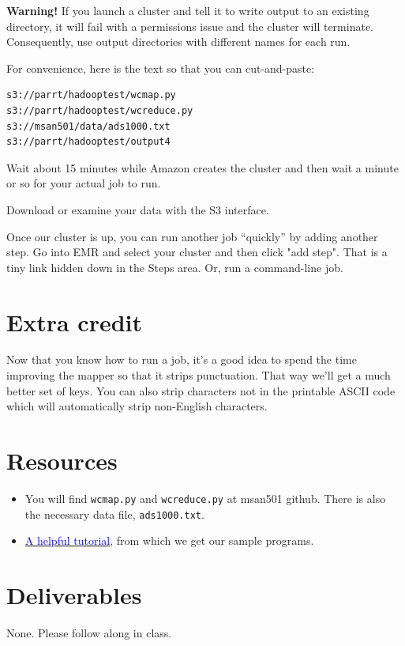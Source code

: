 \begin{fullwidth}
{\bf Warning!} If you launch a cluster and tell it to write output to an existing directory, it will fail with a permissions issue and the cluster will terminate.  Consequently, use output directories with different names for each run.

For convenience, here is the text so that you can cut-and-paste:

\begin{lstlisting}[style=BashInputStyle]
s3://parrt/hadooptest/wcmap.py
s3://parrt/hadooptest/wcreduce.py
s3://msan501/data/ads1000.txt
s3://parrt/hadooptest/output4
\end{lstlisting}

\step Wait about 15 minutes while Amazon creates the cluster and then wait a minute or so for your actual job to run.

\step Download or examine your data with the S3 interface.

Once our cluster is up, you can run another job ``quickly'' by adding another step. Go into EMR and select your cluster and then click "add step". That is a tiny link hidden down in the Steps area.  Or, run a command-line job.

\section{Extra credit}

Now that you know how to run a job, it's a good idea to spend the time improving the mapper so that it strips punctuation. That way we'll get a much better set of keys. You can also strip characters not in the printable ASCII code which will automatically strip non-English characters.

\section{Resources}

\begin{itemize}
\item You will find {\tt wcmap.py} and {\tt wcreduce.py} at msan501 github. There is also the necessary data file, {\tt ads1000.txt}.
\item \href{http://cs.smith.edu/dftwiki/index.php/Hadoop_Tutorial_3.2_--_Using_Your_Own_Streaming_WordCount_program}{\textcolor{blue}{A helpful tutorial}}, from which we get our sample programs.
\end{itemize}

\section{Deliverables}

None. Please follow along in class.

\end{fullwidth}
